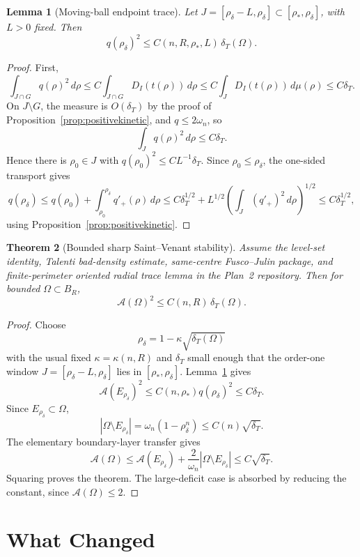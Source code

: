 \documentclass[11pt]{article}
\newtheorem{theorem}{Theorem}[section]
\newtheorem{lemma}[theorem]{Lemma}
\theoremstyle{definition}
\newcommand{\Fr}{\mathcal A}
\newcommand{\rstar}{\rho_*}
\newcommand{\rdel}{\rho_\delta}
\begin{document}
\begin{lemma}[Moving-ball endpoint trace]\label{lem:endpoint}
Let \(J=[\rdel-L,\rdel]\subset[\rstar,\rdel]\), with \(L>0\) fixed.  Then
\[
   q(\rdel)^2\le C(n,R,\rstar,L)\,\delta_T(\Omega).
\]
\end{lemma}

\begin{proof}
First,
\[
   \int_{J\cap G}q(\rho)^2\,d\rho
   \le C\int_{J\cap G}D_I(t(\rho))\,d\rho
   \le C\int_JD_I(t(\rho))\,d\mu(\rho)
   \le C\delta_T.
\]
On \(J\setminus G\), the measure is \(O(\delta_T)\) by the proof of
Proposition~\ref{prop:positivekinetic}, and \(q\le2\omega_n\), so
\[
   \int_J q(\rho)^2\,d\rho\le C\delta_T.
\]
Hence there is \(\rho_0\in J\) with \(q(\rho_0)^2\le C L^{-1}\delta_T\).
Since \(\rho_0\le\rdel\), the one-sided transport gives
\[
   q(\rdel)
   \le q(\rho_0)+\int_{\rho_0}^{\rdel}q'_+(\rho)\,d\rho
   \le C\delta_T^{1/2}
      +L^{1/2}\left(\int_J(q'_+)^2\,d\rho\right)^{1/2}
   \le C\delta_T^{1/2},
\]
using Proposition~\ref{prop:positivekinetic}.
\end{proof}

\begin{theorem}[Bounded sharp Saint--Venant stability]\label{thm:boundedSV}
Assume the level-set identity, Talenti bad-density estimate, same-centre
Fusco--Julin package, and finite-perimeter oriented radial trace lemma in
the Plan~2 repository.  Then for bounded \(\Omega\subset B_R\),
\[
   \Fr(\Omega)^2\le C(n,R)\,\delta_T(\Omega).
\]
\end{theorem}

\begin{proof}
Choose
\[
   \rdel=1-\kappa\sqrt{\delta_T(\Omega)}
\]
with the usual fixed \(\kappa=\kappa(n,R)\) and \(\delta_T\) small enough
that the order-one window \(J=[\rdel-L,\rdel]\) lies in \([\rstar,\rdel]\).
Lemma~\ref{lem:endpoint} gives
\[
   \Fr(E_{\rdel})^2\le C(n,\rstar)q(\rdel)^2\le C\delta_T.
\]
Since \(E_{\rdel}\subset\Omega\),
\[
   |\Omega\setminus E_{\rdel}|=\omega_n(1-\rdel^n)
   \le C(n)\sqrt{\delta_T}.
\]
The elementary boundary-layer transfer gives
\[
   \Fr(\Omega)\le \Fr(E_{\rdel})+\frac{2}{\omega_n}|\Omega\setminus E_{\rdel}|
   \le C\sqrt{\delta_T}.
\]
Squaring proves the theorem.  The large-deficit case is absorbed by reducing
the constant, since \(\Fr(\Omega)\le2\).
\end{proof}

\section{What Changed}
\end{document}
